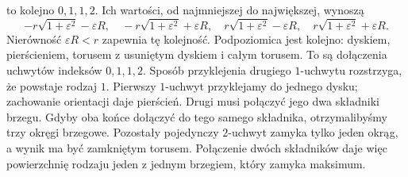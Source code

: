 \begin{przyklad}
to kolejno $0,1,1,2$.
Ich wartości, od najmniejszej
do największej, wynoszą
\[
 -r\sqrt{1+\varepsilon^2}-\varepsilon R,\quad
 -r\sqrt{1+\varepsilon^2}+\varepsilon R,\quad
 r\sqrt{1+\varepsilon^2}-\varepsilon R,\quad
 r\sqrt{1+\varepsilon^2}+\varepsilon R.
\]
Nierówność $\varepsilon R<r$
zapewnia tę kolejność.
Podpoziomica jest kolejno:
dyskiem, pierścieniem,
torusem z usuniętym dyskiem
i całym torusem. To są
dołączenia uchwytów indeksów
$0,1,1,2$. Sposób przyklejenia
drugiego $1$-uchwytu rozstrzyga,
że powstaje rodzaj $1$.
Pierwszy $1$-uchwyt przyklejamy do jednego dysku;
zachowanie orientacji daje pierścień.
Drugi musi połączyć jego dwa składniki brzegu.
Gdyby oba końce dołączyć do tego samego składnika,
otrzymalibyśmy trzy okręgi brzegowe. Pozostały pojedynczy
$2$-uchwyt zamyka tylko jeden okrąg, a wynik ma być zamkniętym torusem.
Połączenie dwóch składników daje więc powierzchnię
rodzaju jeden z jednym brzegiem, który zamyka maksimum.
\end{przyklad}

